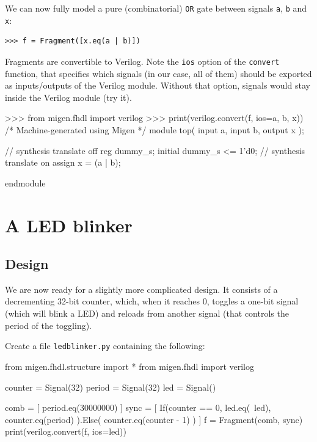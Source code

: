 \documentclass[11pt]{paper}
\begin{document}

We can now fully model a pure (combinatorial) \verb!OR! gate between signals \verb!a!, \verb!b! and \verb!x!:
\begin{verbatim}
>>> f = Fragment([x.eq(a | b)])
\end{verbatim}

Fragments are convertible to Verilog. Note the \verb!ios! option of the \verb!convert! function, that specifies which signals (in our case, all of them) should be exported as inputs/outputs of the Verilog module. Without that option, signals would stay inside the Verilog module (try it).
\begin{verbatimtab}
>>> from migen.fhdl import verilog
>>> print(verilog.convert(f, ios={a, b, x}))
/* Machine-generated using Migen */
module top(
        input a,
        input b,
        output x
);


// synthesis translate off
reg dummy_s;
initial dummy_s <= 1'd0;
// synthesis translate on
assign x = (a | b);

endmodule
\end{verbatimtab}


\section{A LED blinker}
\subsection{Design}
We are now ready for a slightly more complicated design. It consists of a decrementing 32-bit counter, which, when it reaches 0, toggles a one-bit signal (which will blink a LED) and reloads from another signal (that controls the period of the toggling).

Create a file \verb!ledblinker.py! containing the following:

\begin{verbatimtab}
from migen.fhdl.structure import *
from migen.fhdl import verilog

counter = Signal(32)
period = Signal(32)
led = Signal()

comb = [
	period.eq(30000000)
]
sync = [
	If(counter == 0,
		led.eq(~led),
		counter.eq(period)
	).Else(
		counter.eq(counter - 1)
	)
]
f = Fragment(comb, sync)
print(verilog.convert(f, ios={led}))
\end{verbatimtab}
\end{document}
